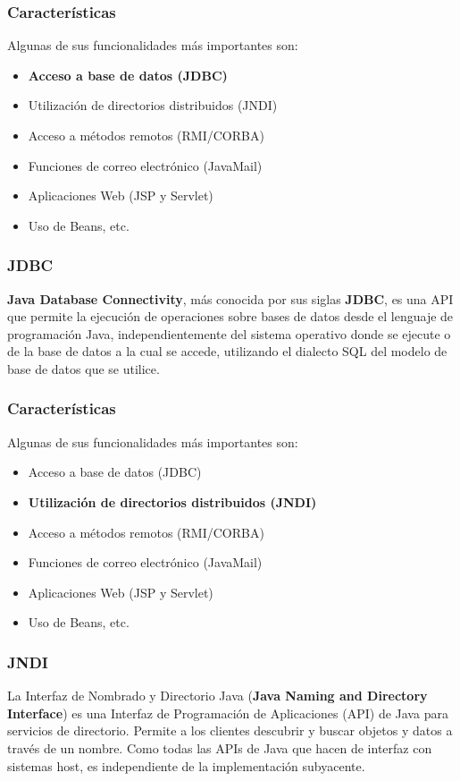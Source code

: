 \documentclass{beamer}
\begin{document}
\begin{frame}
  \frametitle{Características}
    Algunas de sus funcionalidades más importantes son:
  \begin{itemize}
    \item \textbf{Acceso a base de datos (JDBC)}
    \item Utilización de directorios distribuidos (JNDI)
    \item Acceso a métodos remotos (RMI/CORBA)
    \item Funciones de correo electrónico (JavaMail)
    \item Aplicaciones Web (JSP y Servlet)
    \item Uso de Beans, etc.
  \end{itemize}
\end{frame}

\begin{frame}
  \frametitle{JDBC}
  \textbf{Java Database Connectivity}, más conocida por sus siglas
  \textbf{JDBC}, es una API que permite la ejecución de operaciones
  sobre bases de datos desde el lenguaje de programación Java,
  independientemente del sistema operativo donde se ejecute o de la base
  de datos a la cual se accede, utilizando el dialecto SQL del modelo de
  base de datos que se utilice.
\end{frame}

\begin{frame}
  \frametitle{Características}
    Algunas de sus funcionalidades más importantes son:
  \begin{itemize}
    \item Acceso a base de datos (JDBC)
    \item \textbf{Utilización de directorios distribuidos (JNDI)}
    \item Acceso a métodos remotos (RMI/CORBA)
    \item Funciones de correo electrónico (JavaMail)
    \item Aplicaciones Web (JSP y Servlet)
    \item Uso de Beans, etc.
  \end{itemize}
\end{frame}

\begin{frame}
  \frametitle{JNDI}
  La Interfaz de Nombrado y Directorio Java (\textbf{Java Naming and
    Directory Interface}) es una Interfaz de Programación de Aplicaciones
  (API) de Java para servicios de directorio. Permite a los clientes
  descubrir y buscar objetos y datos a través de un nombre. Como todas
  las APIs de Java que hacen de interfaz con sistemas host, es
  independiente de la implementación subyacente.
\end{frame}
\end{document}
